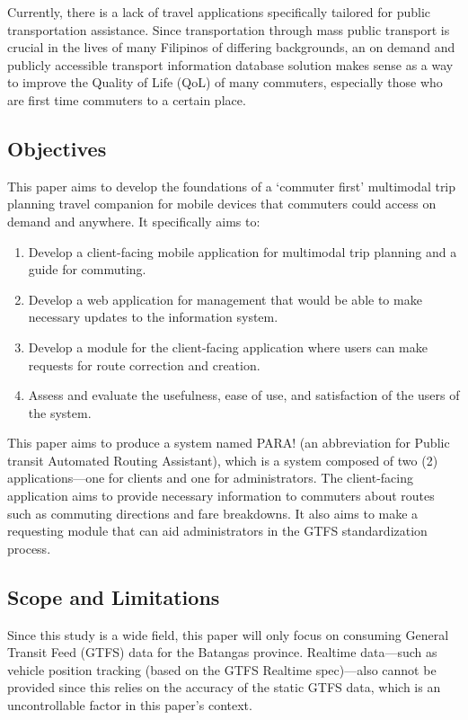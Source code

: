 \documentclass{icsthesis}
\begin{document}
\begin{mainmatter}
Currently, there is a lack of travel applications specifically tailored for public transportation assistance.
Since transportation through mass public transport is crucial in the lives of many Filipinos of differing backgrounds, an on demand and publicly accessible transport information database solution makes sense as a way to improve the Quality of Life (QoL) of many commuters, especially those who are first time commuters to a certain place.


\subsection{Objectives}
This paper aims to develop the foundations of a `commuter first' multimodal trip planning travel companion for mobile devices that commuters could access on demand and anywhere. It specifically aims to:

\begin{enumerate}
    \item Develop a client-facing mobile application for multimodal trip planning and a guide for commuting.
    \item Develop a web application for management that would be able to make necessary updates to the information system.
    \item Develop a module for the client-facing application where users can make requests for route correction and creation.
    \item Assess and evaluate the usefulness, ease of use, and satisfaction of the users of the system.
\end{enumerate}

This paper aims to produce a system named PARA\@! (an abbreviation for Public transit Automated Routing Assistant), which is a system composed of two (2) applications---one for clients and one for administrators.
The client-facing application aims to provide necessary information to commuters about routes such as commuting directions and fare breakdowns.
It also aims to make a requesting module that can aid administrators in the GTFS standardization process.

\subsection{Scope and Limitations}
Since this study is a wide field, this paper will only focus on consuming General Transit Feed (GTFS) data for the Batangas province. Realtime data---such as vehicle position tracking (based on the GTFS Realtime spec)---also cannot be provided since this relies on the accuracy of the static GTFS data, which is an uncontrollable factor in this paper's context.


\end{mainmatter}
\end{document}
